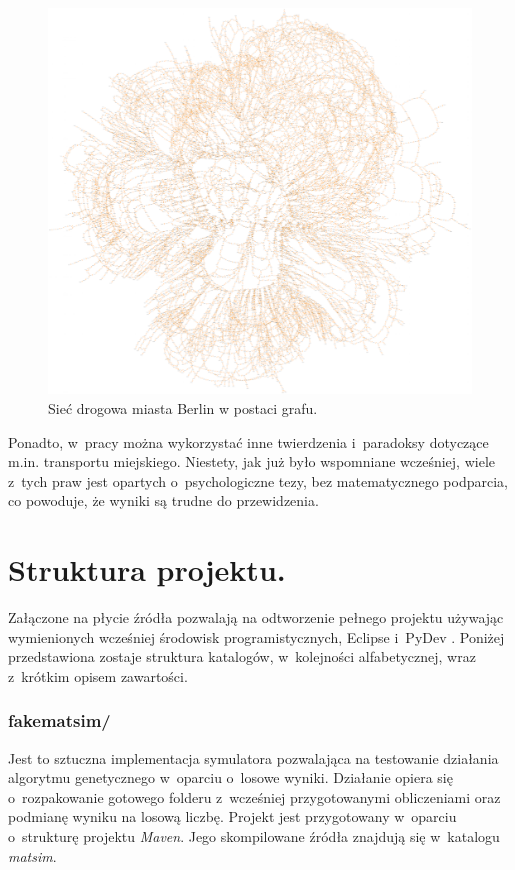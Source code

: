 \documentclass[twoside,12pt]{report}
\begin{document}
\begin{figure}[ht]
\centering
\includegraphics[width=\textwidth]{img/berlin2}
\caption{Sieć drogowa miasta Berlin w postaci grafu.}
\label{berlin}
\end{figure}

Ponadto, w~pracy można wykorzystać inne twierdzenia i~paradoksy dotyczące m.in. transportu miejskiego. Niestety, jak już było wspomniane wcześniej, wiele z~tych praw jest opartych o~psychologiczne tezy, bez matematycznego podparcia, co powoduje, że wyniki są trudne do przewidzenia.

\section{Struktura projektu.}

Załączone na płycie źródła pozwalają na odtworzenie pełnego projektu używając wymienionych wcześniej środowisk programistycznych, Eclipse \cite{eclipse} i~PyDev \cite{pydev}. Poniżej przedstawiona zostaje struktura katalogów, w~kolejności alfabetycznej, wraz z~krótkim opisem zawartości.

\subsubsection{fakematsim/}
Jest to sztuczna implementacja symulatora pozwalająca na testowanie działania algorytmu genetycznego w~oparciu o~losowe wyniki. Działanie opiera się o~rozpakowanie gotowego folderu z~wcześniej przygotowanymi obliczeniami oraz podmianę wyniku na losową liczbę. Projekt jest przygotowany w~oparciu o~strukturę projektu \textit{Maven}. Jego skompilowane źródła znajdują się  w~katalogu \textit{matsim}.
\end{document}
